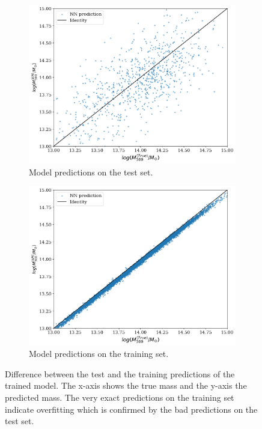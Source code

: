 \begin{figure}[H]
\centering
\begin{subfigure}{.46\textwidth}
  \centering
  \includegraphics[width=\linewidth]{images/Chapter4/Basic CNN/overf_test_set.png}
  \caption{Model predictions on the test set.}
  \label{fig:overf_comp_test}
\end{subfigure}%
\hspace{.6em}
\begin{subfigure}{.46\textwidth}
  \centering
  \includegraphics[width=\linewidth]{images/Chapter4/Basic CNN/overf_test_trainset.png}
  \caption{Model predictions on the training set.}
  \label{fig:overf_comp_train}
\end{subfigure}
\caption{Difference between the test and the training predictions of the trained model. The x-axis shows the true mass and the y-axis the predicted mass. The very exact predictions on the training set indicate overfitting which is confirmed by the bad predictions on the test set.} 
\label{fig:overf_comp}
\end{figure}

